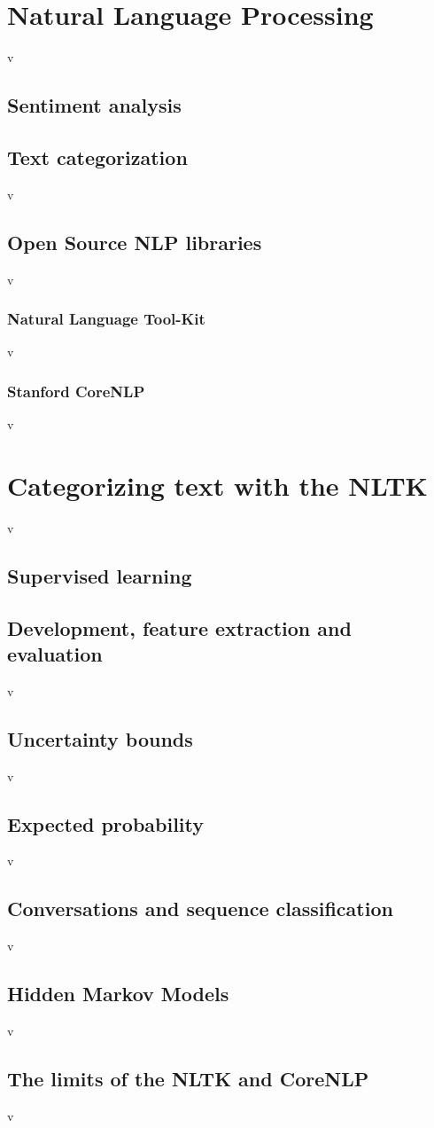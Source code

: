 \documentclass[12pt, twoside, a4paper, draft]{report}
\begin{document}
\section{Natural Language Processing}v
\subsection{Sentiment analysis}
\subsection{Text categorization}v
\subsection{Open Source NLP libraries}v
\subsubsection{Natural Language Tool-Kit}v
\subsubsection{Stanford CoreNLP}v
\section{Categorizing text with the NLTK}v
\subsection{Supervised learning}
\subsection{Development, feature extraction and evaluation}v
\subsection{Uncertainty bounds}v
\subsection{Expected probability}v
\subsection{Conversations and sequence classification}v
\subsection{Hidden Markov Models}v
\subsection{The limits of the NLTK and CoreNLP}v
\end{document}
